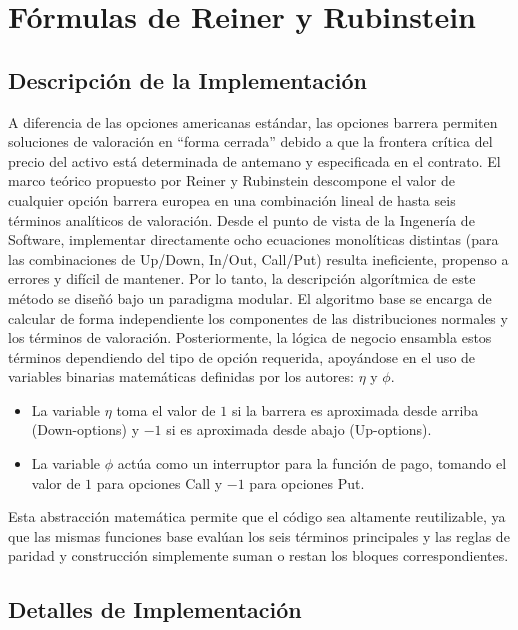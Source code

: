 \section{Fórmulas de Reiner y Rubinstein}
\label{sec:impl_rr}

\subsection{Descripción de la Implementación}
\label{subsec:desc_impl_rr}

A diferencia de las opciones americanas estándar, las opciones barrera permiten soluciones de valoración en ``forma cerrada'' debido a que la frontera crítica del precio del activo está determinada de antemano y especificada en el contrato. El marco teórico propuesto por Reiner y Rubinstein descompone el valor de cualquier opción barrera europea en una combinación lineal de hasta seis términos analíticos de valoración.
Desde el punto de vista de la Ingenería de Software, implementar directamente ocho ecuaciones monolíticas distintas (para las combinaciones de Up/Down, In/Out, Call/Put) resulta ineficiente, propenso a errores y difícil de mantener. Por lo tanto, la descripción algorítmica de este método se diseñó bajo un paradigma modular.
El algoritmo base se encarga de calcular de forma independiente los componentes de las distribuciones normales y los términos de valoración. Posteriormente, la lógica de negocio ensambla estos términos dependiendo del tipo de opción requerida, apoyándose en el uso de variables binarias matemáticas definidas por los autores: $\eta$ y $\phi$.
\begin{itemize}
  \item La variable $\eta$ toma el valor de $1$ si la barrera es aproximada desde arriba (Down-options) y $-1$ si es aproximada desde abajo (Up-options).
  \item La variable $\phi$ actúa como un interruptor para la función de pago, tomando el valor de $1$ para opciones Call y $-1$ para opciones Put.
\end{itemize}

Esta abstracción matemática permite que el código sea altamente reutilizable, ya que las mismas funciones base evalúan los seis términos principales y las reglas de paridad y construcción simplemente suman o restan los bloques correspondientes.

\subsection{Detalles de Implementación}
\label{subsec:detalles_impl_rr}


